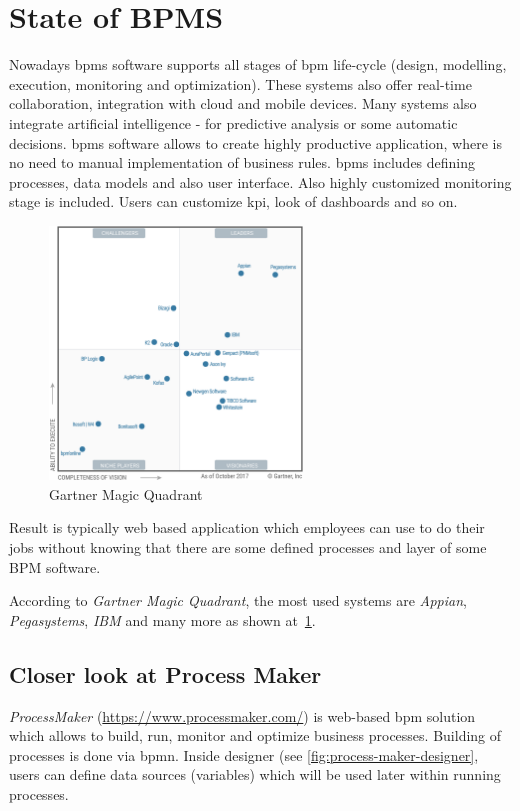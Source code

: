 \section{State of BPMS}
Nowadays \gls{bpms} software supports all stages of \gls{bpm} life-cycle (design, modelling, execution, monitoring and optimization). These systems also offer real-time collaboration, integration with cloud and mobile devices. Many systems also integrate artificial intelligence - for predictive analysis or some automatic decisions. \gls{bpms} software allows to create highly productive application, where is no need to manual implementation of business rules. \gls{bpms} includes defining processes, data models and also user interface. Also highly customized monitoring stage is included. Users can customize \gls{kpi}, look of dashboards and so on.  

\begin{figure}[ht!]
	\centering
    \includegraphics[width=0.6\textwidth, keepaspectratio]{img/gartner-magic-quadrant.png}
    \caption{Gartner Magic Quadrant\cite{gartner-2017} }
    \label{fig:gartner-magic-quadrant}
\end{figure}

Result is typically web based application which employees can use to do their jobs without knowing that there are some defined processes and layer of some BPM software. 

According to \textit{Gartner Magic Quadrant}\cite{gartner-2017}, the most used systems are \textit{Appian}, \textit{Pegasystems}, \textit{IBM} and many more as shown at~\cref{fig:gartner-magic-quadrant}.

 \subsection{Closer look at Process Maker}
 \textit{ProcessMaker} (\href{https://www.processmaker.com/}{https://www.processmaker.com/}) is web-based \gls{bpm} solution which allows to build, run, monitor and optimize business processes. Building of processes is done via \gls{bpmn}. Inside designer (see \cref{fig:process-maker-designer}, users can define data sources (variables) which will be used later within running processes. 
 
